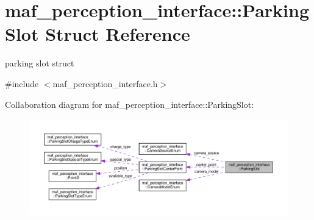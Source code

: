 \hypertarget{structmaf__perception__interface_1_1ParkingSlot}{}\section{maf\+\_\+perception\+\_\+interface\+:\+:Parking\+Slot Struct Reference}
\label{structmaf__perception__interface_1_1ParkingSlot}


parking slot struct  




{\ttfamily \#include $<$maf\+\_\+perception\+\_\+interface.\+h$>$}



Collaboration diagram for maf\+\_\+perception\+\_\+interface\+:\+:Parking\+Slot\+:\nopagebreak
\begin{figure}[H]
\begin{center}
\leavevmode
\includegraphics[width=350pt]{structmaf__perception__interface_1_1ParkingSlot__coll__graph}
\end{center}
\end{figure}
